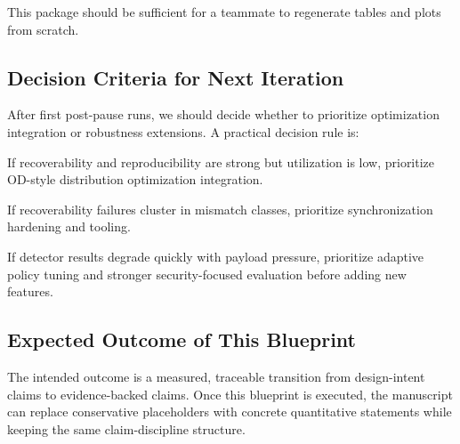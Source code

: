 This package should be sufficient for a teammate to regenerate tables and plots from scratch.

\subsection{Decision Criteria for Next Iteration}

After first post-pause runs, we should decide whether to prioritize optimization integration or robustness extensions. A practical decision rule is:

If recoverability and reproducibility are strong but utilization is low, prioritize OD-style distribution optimization integration.

If recoverability failures cluster in mismatch classes, prioritize synchronization hardening and tooling.

If detector results degrade quickly with payload pressure, prioritize adaptive policy tuning and stronger security-focused evaluation before adding new features.

\subsection{Expected Outcome of This Blueprint}

The intended outcome is a measured, traceable transition from design-intent claims to evidence-backed claims. Once this blueprint is executed, the manuscript can replace conservative placeholders with concrete quantitative statements while keeping the same claim-discipline structure.
